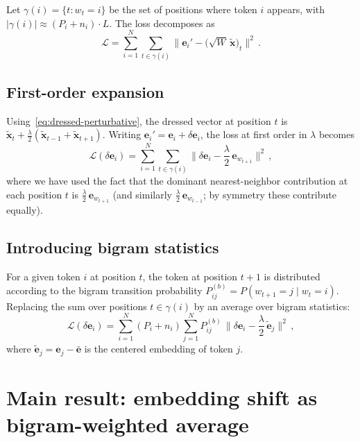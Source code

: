 \documentclass[11pt]{article}
\newcommand{\ee}{\bm{e}}
\begin{document}
Let $\gamma(i) = \{t : w_t = i\}$ be the set of positions where token $i$ appears, with $|\gamma(i)| \approx (P_i + n_i) \cdot L$. The loss decomposes as
\begin{equation}\label{eq:loss-grouped}
    \mathcal{L} = \sum_{i=1}^{N} \sum_{t \in \gamma(i)} \big\|\ee_i' - \big(\sqrt{W}\, \tilde{\bm{x}}\big)_t\big\|^2\,.
\end{equation}

\subsection{First-order expansion}

Using~\eqref{eq:dressed-perturbative}, the dressed vector at position $t$ is $\tilde{\bm{x}}_t + \frac{\lambda}{2}(\tilde{\bm{x}}_{t-1} + \tilde{\bm{x}}_{t+1})$. Writing $\ee_i' = \ee_i + \delta\ee_i$, the loss at first order in $\lambda$ becomes
\begin{equation}\label{eq:loss-first-order}
    \mathcal{L}(\delta\ee_i) = \sum_{i=1}^{N} \sum_{t \in \gamma(i)} \Big\|\delta\ee_i - \frac{\lambda}{2}\, \ee_{w_{t+1}}\Big\|^2\,,
\end{equation}
where we have used the fact that the dominant nearest-neighbor contribution at each position $t$ is $\frac{\lambda}{2}\, \ee_{w_{t+1}}$ (and similarly $\frac{\lambda}{2}\, \ee_{w_{t-1}}$; by symmetry these contribute equally).

\subsection{Introducing bigram statistics}

For a given token $i$ at position $t$, the token at position $t+1$ is distributed according to the bigram transition probability $P_{ij}^{(b)} = P(w_{t+1} = j \mid w_t = i)$. Replacing the sum over positions $t \in \gamma(i)$ by an average over bigram statistics:
\begin{equation}\label{eq:loss-bigram}
    \mathcal{L}(\delta\ee_i) = \sum_{i=1}^{N} (P_i + n_i) \sum_{j=1}^{N} P_{ij}^{(b)}\, \Big\|\delta\ee_i - \frac{\lambda}{2}\, \tilde{\ee}_j\Big\|^2\,,
\end{equation}
where $\tilde{\ee}_j = \ee_j - \bar{\ee}$ is the centered embedding of token $j$.

\section{Main result: embedding shift as bigram-weighted average}\label{sec:result}
\end{document}
